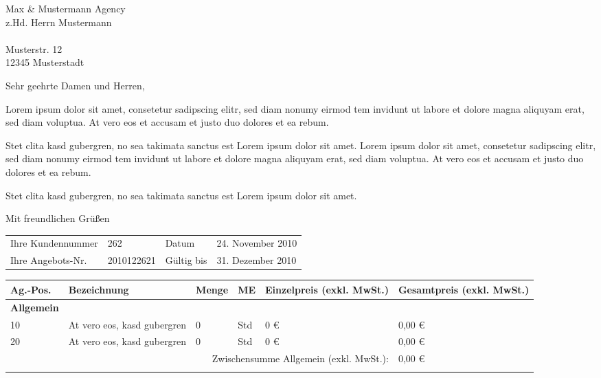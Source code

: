 \documentclass[DIN, pagenumber=footmiddle, parskip=half,
	fromalign=right,  %
	fromphone=true, fromfax=false,
	fromrule=false]{scrlttr2}
\begin{document}
\begin{letter}{
	Max \& Mustermann Agency\\
	z.Hd. Herrn Mustermann\\ \ \\
	Musterstr. 12\\
	12345 Musterstadt
}

\opening{Sehr geehrte Damen und Herren,}
Lorem ipsum dolor sit amet, consetetur sadipscing elitr, sed diam nonumy eirmod tem
invidunt ut labore et dolore magna aliquyam erat, sed diam voluptua. At vero eos et accusam
et justo duo dolores et ea rebum.

Stet clita kasd gubergren, no sea takimata sanctus est Lorem ipsum dolor sit amet. Lorem
ipsum dolor sit amet, consetetur sadipscing elitr, sed diam nonumy eirmod tem invidunt ut
labore et dolore magna aliquyam erat, sed diam voluptua. At vero eos et accusam et justo duo
dolores et ea rebum.

Stet clita kasd gubergren, no sea takimata sanctus est Lorem ipsum dolor sit amet.\\

\closing{Mit freundlichen Grüßen}


\newpage


\begin{longtable}{p{4cm}p{6.5cm}p{2cm}p{4cm}}
	Ihre Kundennummer	& 262 & Datum & 24. November 2010\\
	Ihre Angebots-Nr. & 2010122621 & Gültig bis & 31. Dezember 2010\\
\end{longtable}


\begin{longtable}{p{2.5cm}p{5.5cm}p{1cm}p{1cm}p{2.5cm}p{2.5cm}}
	\hline
	Ag.-Pos. & Bezeichnung & Menge & ME & Einzelpreis (exkl. MwSt.) & Gesamtpreis (exkl. MwSt.)\\
	\hline

	\textbf{Allgemein}\\
	10 & At vero eos, kasd gubergren & 0 & Std & 0 \euro{} & 0,00 \euro{}\\
	20 & At vero eos, kasd gubergren  & 0 & Std & 0 \euro{} & 0,00 \euro{}\\
	\multicolumn{5}{r}{Zwischensumme Allgemein (exkl. MwSt.):} & 0,00 \euro{}\\
	\\


\end{longtable}
\end{letter}
\end{document}
